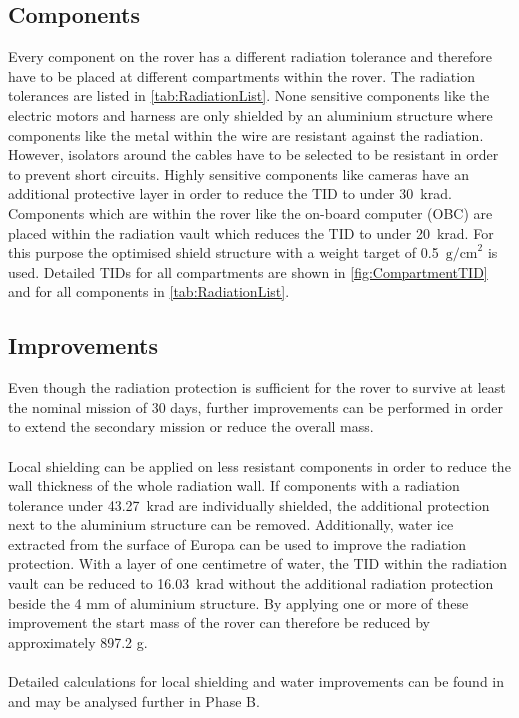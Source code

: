 \subsection{Components}

\label{subsec:RadiationComponents}

Every component on the rover has a different radiation tolerance and therefore have to be placed at different compartments within the rover. The radiation tolerances are listed in \autoref{tab:RadiationList}. None sensitive components like the electric motors and harness are only shielded by an aluminium structure where components like the metal within the wire are resistant against the radiation. However, isolators around the cables have to be selected to be resistant in order to prevent short circuits. Highly sensitive components like cameras have an additional protective layer in order to reduce the TID to under 30~krad. Components which are within the rover like the on-board computer (OBC) are placed within the radiation vault which reduces the TID to under 20~krad. For this purpose the optimised shield structure with a weight target of 0.5~\(\text{g/cm}^2\) is used. Detailed TIDs for all compartments are shown in \autoref{fig:CompartmentTID} and for all components in \autoref{tab:RadiationList}.

\subsection{Improvements}

\label{subsec:RadiationImprovements}

Even though the radiation protection is sufficient for the rover to survive at least the nominal mission of 30 days, further improvements can be performed in order to extend the secondary mission or reduce the overall mass. \\ \\
Local shielding can be applied on less resistant components in order to reduce the wall thickness of the whole radiation wall. If components with a radiation tolerance under 43.27~krad are individually shielded, the additional protection next to the aluminium structure can be removed. Additionally, water ice extracted from the surface of Europa can be used to improve the radiation protection. With a layer of one centimetre of water, the TID within the radiation vault can be reduced to 16.03~krad without the additional radiation protection beside the 4 mm of aluminium structure. By applying one or more of these improvement the start mass of the rover can therefore be reduced by approximately 897.2 g. \\ \\
Detailed calculations for local shielding and water improvements can be found in  and may be analysed further in Phase B.

